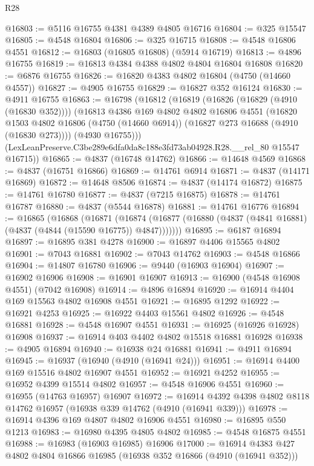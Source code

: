 \begin{lexlean}{R28}
\begin{coremodule}
@16803 := @5116 @16755 @4381 @4389 @4805 @16716
@16804 := @325 @15547
@16805 := @4548 @16804
@16806 := @325 @16715
@16808 := @4548 @16806 @4551
@16812 := @16803 (@16805 @16808) (@5914 @16719)
@16813 := @4896 @16755
@16819 := @16813 @4384 @4388 @4802 @4804 @16804 @16808
@16820 := @6876 @16755
@16826 := @16820 @4383 @4802 @16804 (@4750 (@14660 @4557))
@16827 := @4905 @16755
@16829 := @16827 @352 @16124
@16830 := @4911 @16755
@16863 := @16798
    (@16812
      (@16819
        (@16826 (@16829 (@4910 (@16830 @352))))
        (@16813
          @4386
          @169
          @4802
          @4802
          @16806
          @4551
          (@16820
            @1503
            @4802
            @16806
            (@4750 (@14660 @6914))
            (@16827 @273 @16688 (@4910 (@16830 @273))))
          (@4930 @16755)))
      (LexLeanPreserve.C3be289e6dfa0da8c188e3fd73ab04928.R28.__rel_80 @15547 @16715))
@16865 := @4837 (@16748 @14762)
@16866 := @14648 @4569
@16868 := @4837 (@16751 @16866)
@16869 := @14761 @6914
@16871 := @4837 (@14171 @16869)
@16872 := @14648 @8506
@16874 := @4837 (@14174 @16872)
@16875 := @14761 @16780
@16877 := @4837 (@7215 @16875)
@16878 := @14761 @16787
@16880 := @4837 (@5544 @16878)
@16881 := @14761 @16776
@16894 := @16865
    (@16868
      (@16871
        (@16874 (@16877 (@16880 (@4837 (@4841 @16881) (@4837 (@4844 (@15590 @16775)) @4847)))))))
@16895 := @6187 @16894
@16897 := @16895 @381 @4278
@16900 := @16897 @4406 @15565 @4802
@16901 := @7043 @16881
@16902 := @7043 @14762
@16903 := @4548 @16866
@16904 := @14807 @16780
@16906 := @9440 (@16903 @16904)
@16907 := @16902 @16906
@16908 := @16901 @16907
@16913 := @16900 (@4548 @16908 @4551) (@7042 @16908)
@16914 := @4896 @16894
@16920 := @16914 @4404 @169 @15563 @4802 @16908 @4551
@16921 := @16895 @1292
@16922 := @16921 @4253
@16925 := @16922 @4403 @15561 @4802
@16926 := @4548 @16881
@16928 := @4548 @16907 @4551
@16931 := @16925 (@16926 @16928) @16908
@16937 := @16914 @403 @4402 @4802 @15518 @16881 @16928
@16938 := @4905 @16894
@16940 := @16938 @24 @16881
@16941 := @4911 @16894
@16945 := @16937 (@16940 (@4910 (@16941 @24)))
@16951 := @16914 @4400 @169 @15516 @4802 @16907 @4551
@16952 := @16921 @4252
@16955 := @16952 @4399 @15514 @4802
@16957 := @4548 @16906 @4551
@16960 := @16955 (@14763 @16957) @16907
@16972 := @16914 @4392 @4398 @4802 @8118 @14762 @16957 (@16938 @339 @14762 (@4910 (@16941 @339)))
@16978 := @16914 @4396 @169 @4807 @4802 @16906 @4551
@16980 := @16895 @550 @1213
@16983 := @16980 @4395 @4805 @4802
@16985 := @4548 @16875 @4551
@16988 := @16983 (@16903 @16985) @16906
@17000 := @16914 @4383 @427 @4802 @4804 @16866 @16985 (@16938 @352 @16866 (@4910 (@16941 @352)))

\end{coremodule}
\end{lexlean}
